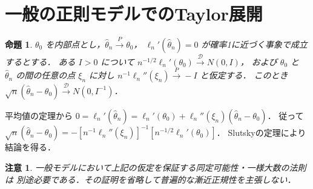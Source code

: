 \documentclass[a5paper,10pt,onecolumn]{jsarticle}
\makeatletter
\theoremstyle{mathnotetheorem}
\newtheorem{proposition}[theorem]{命題}
\newtheorem{remark}[theorem]{注意}
\renewcommand{\proofname}{証明}
\renewenvironment{proof}[1][\proofname]{%
  \par\pushQED{\qed}\normalfont\topsep4\p@\@plus2\p@\relax
  \trivlist\item[\hskip\labelsep\bfseries #1]\ignorespaces
}{\popQED\endtrivlist\@endpefalse}
\makeatother
\begin{document}
\section{一般の正則モデルでのTaylor展開}
\begin{proposition}
$\theta_0$ を内部点とし，$\widehat\theta_n\xrightarrow{P}\theta_0$，
$\ell_n'(\widehat\theta_n)=0$ が確率1に近づく事象で成立するとする．
ある $I>0$ について
$n^{-1/2}\ell_n'(\theta_0)\xrightarrow{\mathcal D}N(0,I)$，
および $\theta_0$ と $\widehat\theta_n$ の間の任意の点 $\xi_n$ に対し
$n^{-1}\ell_n''(\xi_n)\xrightarrow{P}-I$ と仮定する．
このとき $\sqrt n(\widehat\theta_n-\theta_0)\xrightarrow{\mathcal D}N(0,I^{-1})$．
\end{proposition}
\begin{proof}
平均値の定理から
$0=\ell_n'(\widehat\theta_n)=\ell_n'(\theta_0)+
\ell_n''(\xi_n)(\widehat\theta_n-\theta_0)$．
従って $\sqrt n(\widehat\theta_n-\theta_0)=
-[n^{-1}\ell_n''(\xi_n)]^{-1}[n^{-1/2}\ell_n'(\theta_0)]$．
Slutskyの定理により結論を得る．
\end{proof}
\begin{remark}
一般モデルにおいて上記の仮定を保証する同定可能性・一様大数の法則は
別途必要である．その証明を省略して普遍的な漸近正規性を主張しない．
\end{remark}
\end{document}
